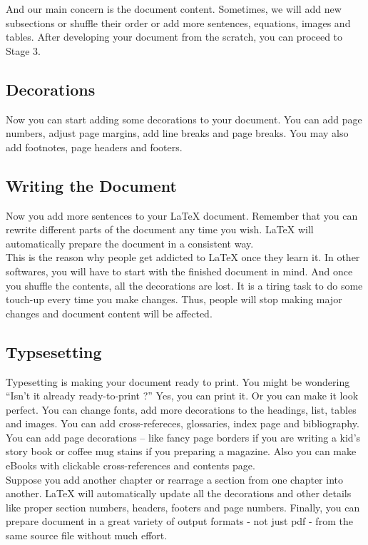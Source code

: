 \documentclass{article}
\begin{document}
	And our main concern is the document content.
	Sometimes, we will add new subsections or shuffle their order or add more sentences, equations, images and tables.
	After developing your document from the scratch, you can proceed to Stage 3.

\subsection{Decorations}
	Now you can start adding some decorations to your document.
	You can add page numbers, adjust page margins, add line breaks and page breaks.
	You may also add footnotes, page headers and footers.

\subsection{Writing the Document}
	Now you add more sentences to your LaTeX document.
	Remember that you can rewrite different parts of the  document any time you wish.
	LaTeX will automatically prepare the document in a consistent way.\\
	
	This is the reason why people get addicted to LaTeX once they learn it.
	In other softwares, you will have to start with the finished document in mind.
	And once you shuffle the contents, all the decorations are lost.
	It is a tiring task to do some touch-up every time you make changes.
	Thus, people will stop making major changes and document content will be affected.

\subsection{Typsesetting}
	Typesetting is making your document ready to print.
	You might be wondering ``Isn't it already ready-to-print ?''
	Yes, you can print it.
	Or you can make it look perfect.
	You can change fonts, add more decorations to the headings, list, tables and images.
	You can add cross-refereces, glossaries, index page and bibliography.
	You can add page decorations -- like fancy page borders if you are writing a kid's story book or coffee mug stains if you preparing a magazine.
	Also you can make eBooks with clickable cross-references and contents page.\\

	Suppose you add another chapter or rearrage a section from one chapter into another.
	LaTeX will automatically update all the decorations and other details like proper section numbers, headers, footers and page numbers.
	Finally, you can prepare document in a great variety of output formats - not just pdf - from the same source file without much effort.
\end{document}
